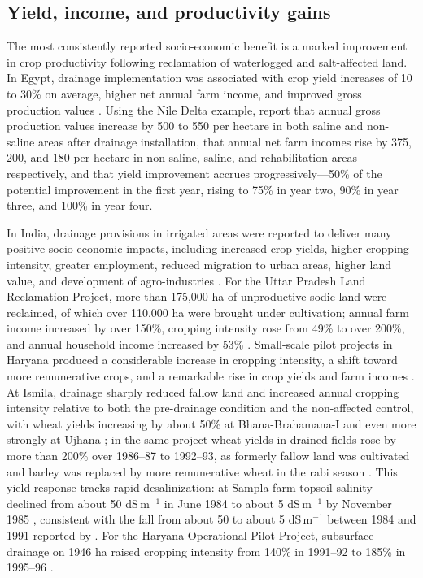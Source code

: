 \documentclass[11pt]{article}
\begin{document}
\subsection{Yield, income, and productivity gains}
The most consistently reported socio-economic benefit is a marked improvement in crop productivity following reclamation of waterlogged and salt-affected land. In Egypt, drainage implementation was associated with crop yield increases of 10 to 30\% on average, higher net annual farm income, and improved gross production values \parencite{AbdelDayem2007}. Using the Nile Delta example, \textcite{Wichelns2002} report that annual gross production values increase by 500 to 550 per hectare in both saline and non-saline areas after drainage installation, that annual net farm incomes rise by 375, 200, and 180 per hectare in non-saline, saline, and rehabilitation areas respectively, and that yield improvement accrues progressively---50\% of the potential improvement in the first year, rising to 75\% in year two, 90\% in year three, and 100\% in year four.

In India, drainage provisions in irrigated areas were reported to deliver many positive socio-economic impacts, including increased crop yields, higher cropping intensity, greater employment, reduced migration to urban areas, higher land value, and development of agro-industries \parencite{Gopalakrishnan2007}. For the Uttar Pradesh Land Reclamation Project, more than 175{,}000 ha of unproductive sodic land were reclaimed, of which over 110{,}000 ha were brought under cultivation; annual farm income increased by over 150\%, cropping intensity rose from 49\% to over 200\%, and annual household income increased by 53\% \parencite{Gopalakrishnan2007}. Small-scale pilot projects in Haryana produced a considerable increase in cropping intensity, a shift toward more remunerative crops, and a remarkable rise in crop yields and farm incomes \parencite{Datta2002}. At Ismila, drainage sharply reduced fallow land and increased annual cropping intensity relative to both the pre-drainage condition and the non-affected control, with wheat yields increasing by about 50\% at Bhana-Brahamana-I and even more strongly at Ujhana \parencite{Datta2002}; in the same project wheat yields in drained fields rose by more than 200\% over 1986--87 to 1992--93, as formerly fallow land was cultivated and barley was replaced by more remunerative wheat in the rabi season \parencite{Datta2000}. This yield response tracks rapid desalinization: at Sampla farm topsoil salinity declined from about 50 dS\,m$^{-1}$ in June 1984 to about 5 dS\,m$^{-1}$ by November 1985 \parencite{Datta2002}, consistent with the fall from about 50 to about 5 dS\,m$^{-1}$ between 1984 and 1991 reported by \textcite{Datta2000}. For the Haryana Operational Pilot Project, subsurface drainage on 1946 ha raised cropping intensity from 140\% in 1991--92 to 185\% in 1995--96 \parencite{Gopalakrishnan2007}.
\end{document}
